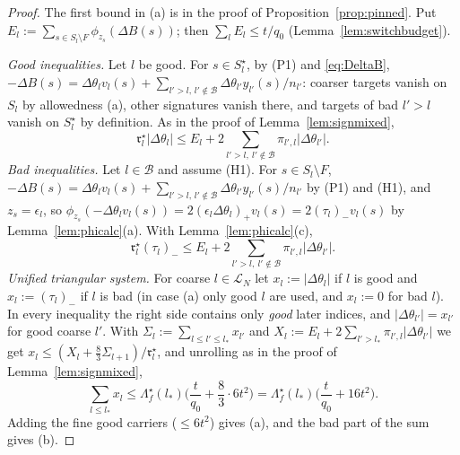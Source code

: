 \begin{proof}
The first bound in (a) is in the proof of Proposition~\ref{prop:pinned}.
Put $E_l:=\sum_{s\in S_l\setminus F}\phi_{z_s}(\Delta B(s))$; then
$\sum_lE_l\le t/q_0$ (Lemma~\ref{lem:switchbudget}).

\emph{Good inequalities.}  Let $l$ be good.  For $s\in S^\star_l$, by (P1)
and \eqref{eq:DeltaB}, $-\Delta B(s)=\Delta\theta_lv_l(s)+\sum_{l'>l,\,l'
\notin\mathcal B}\Delta\theta_{l'}y_{l'}(s)/n_{l'}$: coarser targets vanish
on $S_l$ by allowedness (a), other signatures vanish there, and targets of
bad $l'>l$ vanish on $S^\star_l$ by definition.  As in the proof of
Lemma~\ref{lem:signmixed},
\[
 \mathfrak r^\star_l|\Delta\theta_l|\le E_l+2\sum_{l'>l,\ l'\notin\mathcal B}
 \pi_{l',l}|\Delta\theta_{l'}| .
\]
\emph{Bad inequalities.}  Let $l\in\mathcal B$ and assume (H1).  For $s\in
S_l\setminus F$, $-\Delta B(s)=\Delta\theta_lv_l(s)+\sum_{l'>l,\,l'\notin
\mathcal B}\Delta\theta_{l'}y_{l'}(s)/n_{l'}$ by (P1) and (H1), and
$z_s=\epsilon_l$, so $\phi_{z_s}(-\Delta\theta_lv_l(s))=2(\epsilon_l
\Delta\theta_l)_+v_l(s)=2(\tau_l)_-v_l(s)$ by Lemma~\ref{lem:phicalc}(a).
With Lemma~\ref{lem:phicalc}(c),
\[
 \mathfrak r^\star_l(\tau_l)_-\le E_l+2\sum_{l'>l,\ l'\notin\mathcal B}
 \pi_{l',l}|\Delta\theta_{l'}| .
\]
\emph{Unified triangular system.}  For coarse $l\in\mathcal L_N$ let
$x_l:=|\Delta\theta_l|$ if $l$ is good and $x_l:=(\tau_l)_-$ if $l$ is bad
(in case (a) only good $l$ are used, and $x_l:=0$ for bad $l$).  In every
inequality the right side contains only \emph{good} later indices, and
$|\Delta\theta_{l'}|=x_{l'}$ for good coarse $l'$.  With
$\Sigma_l:=\sum_{l\le l'\le l_*}x_{l'}$ and $X_l:=E_l+2\sum_{l'>l_*}
\pi_{l',l}|\Delta\theta_{l'}|$ we get $x_l\le(X_l+\frac83\Sigma_{l+1})/
\mathfrak r^\star_l$, and unrolling as in the proof of
Lemma~\ref{lem:signmixed},
\[
 \sum_{l\le l_*}x_l\le\Lambda^\star_f(l_*)\Big(\frac t{q_0}+\frac83\cdot
 6t^2\Big)=\Lambda^\star_f(l_*)\Big(\frac t{q_0}+16t^2\Big).
\]
Adding the fine good carriers ($\le6t^2$) gives (a), and the bad part of
the sum gives (b).
\end{proof}

